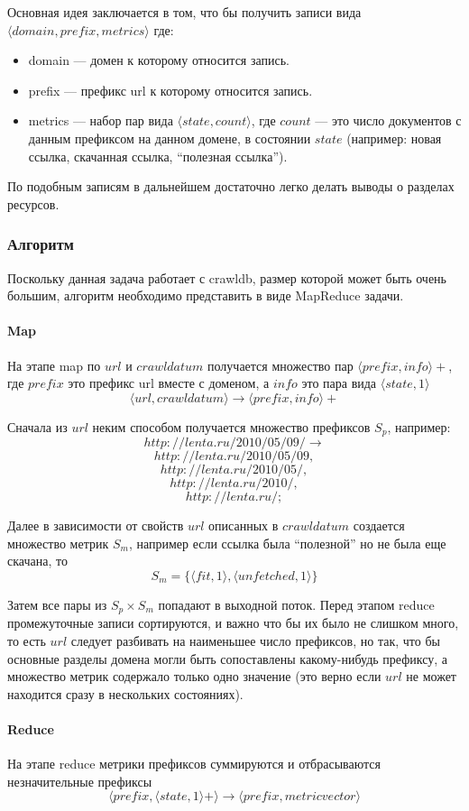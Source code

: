 Основная идея заключается в том, что бы получить записи вида $\langle domain,prefix,metrics \rangle$ где:
\begin{itemize}
 \item domain --- домен к которому относится запись.
 \item prefix --- префикс url к которому относится запись.
 \item metrics --- набор пар вида $\langle state, count\rangle$, где $count$ --- это число документов с данным префиксом на данном домене, в состоянии $state$ (например: новая ссылка, скачанная ссылка, ``полезная ссылка'').
\end{itemize}
По подобным записям в дальнейшем достаточно легко делать выводы о разделах ресурсов.
\subsubsection{Алгоритм}
Поскольку данная задача работает с crawldb, размер которой может быть очень большим, алгоритм необходимо представить в виде MapReduce задачи.

\paragraph{Map}
На этапе map по $url$ и $crawldatum$ получается множество пар $\langle prefix,info\rangle+$, где $prefix$ это префикс url вместе с доменом, а $info$ это пара вида $\langle state,1\rangle$
$$\langle url, crawldatum \rangle \rightarrow \langle prefix,info\rangle+ $$

Сначала из $url$ неким способом получается множество префиксов $S_{p}$, например:
$$ http://lenta.ru/2010/05/09/ \rightarrow $$
$$ http://lenta.ru/2010/05/09, $$
$$ http://lenta.ru/2010/05/, $$
$$ http://lenta.ru/2010/, $$
$$ http://lenta.ru/; $$


Далее в зависимости от свойств $url$ описанных в $crawldatum$ создается множество метрик $S_{m}$, например если ссылка была ``полезной'' но не была еще скачана, то $$ S_{m}=\{\langle fit,1\rangle, \langle unfetched,1\rangle\}$$

Затем все пары из $S_{p} \times S_{m}$ попадают в выходной поток. Перед этапом reduce промежуточные записи сортируются, и важно что бы их было не слишком много, то есть $url$ следует разбивать на наименьшее число префиксов, но так, что бы основные разделы домена могли быть сопоставлены какому-нибудь префиксу, а множество метрик содержало только одно значение (это верно если $url$ не может находится сразу в нескольких состояниях).
\paragraph{Reduce}
На этапе reduce метрики префиксов суммируются и отбрасываются незначительные префиксы
$$\langle prefix,\langle state,1\rangle+\rangle \rightarrow \langle prefix,metricvector\rangle$$

